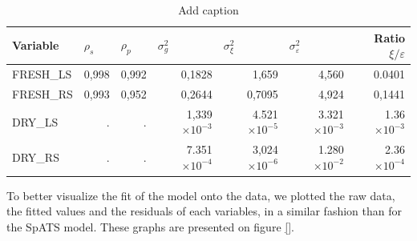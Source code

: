 \begin{table}[htbp]
  \centering
  \caption{Add caption}
    \begin{tabular}{lrrrrrr}
    \toprule
    Variable & \multicolumn{1}{l}{$\rho_{s}$} & \multicolumn{1}{l}{$\rho_{p}$} & \multicolumn{1}{l}{$\sigma_{g}^{2}$} & \multicolumn{1}{l}{$\sigma_{\xi}^{2}$} & \multicolumn{1}{l}{$\sigma_{\varepsilon}^{2}$} & Ratio $\xi / \varepsilon$ \\
    \midrule
    FRESH\_LS &   0,998    &    0,992   &    0,1828   &    1,659   &    4,560   & 0.0401 \\
    FRESH\_RS &   0,993    &   0,952    &    0,2644   &    0,7095   &   4,924    & 0,1441 \\
    DRY\_LS &   .    &     .  &   1,339$\times 10^{-3}$   &    4.521$\times 10^{-5}$   &   3.321$\times 10^{-3}$    & 1.36$ \times 10^{-3}$ \\
    DRY\_RS &  .   &  .   &    7.351$\times 10^{-4}$   &   3,024$\times 10^{-6}$    &    1.280$\times 10^{-2}$   & 2.36$\times 10^{-4}$ \\
    \bottomrule
    \end{tabular}%
  \label{tab:BSS_variance_values}%
\end{table}%

To better visualize the fit of the model onto the data, we plotted the raw data, the fitted values and the residuals of each variables, in a similar fashion than for the SpATS model. These graphs are presented on figure \ref{}.

